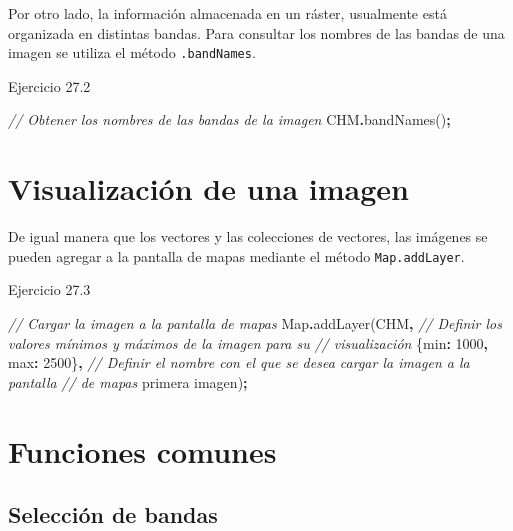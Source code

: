 \documentclass[
  12pt,
  letterpaper,
  twoside]{book}
\newenvironment{Shaded}{\begin{snugshade}}{\end{snugshade}}
\newcommand{\BuiltInTok}[1]{#1}
\newcommand{\CommentTok}[1]{\textcolor[rgb]{0.56,0.35,0.01}{\textit{#1}}}
\newcommand{\DataTypeTok}[1]{\textcolor[rgb]{0.13,0.29,0.53}{#1}}
\newcommand{\DecValTok}[1]{\textcolor[rgb]{0.00,0.00,0.81}{#1}}
\newcommand{\FunctionTok}[1]{\textcolor[rgb]{0.00,0.00,0.00}{#1}}
\newcommand{\NormalTok}[1]{#1}
\newcommand{\OperatorTok}[1]{\textcolor[rgb]{0.81,0.36,0.00}{\textbf{#1}}}
\newcommand{\StringTok}[1]{\textcolor[rgb]{0.31,0.60,0.02}{#1}}
\begin{document}
Por otro lado, la información almacenada en un ráster, usualmente está organizada en distintas bandas. Para consultar los nombres de las bandas de una imagen se utiliza el método \texttt{.bandNames}.

Ejercicio 27.2

\begin{Shaded}
\begin{Highlighting}[]
\CommentTok{// Obtener los nombres de las bandas de la imagen}
\NormalTok{CHM}\OperatorTok{.}\FunctionTok{bandNames}\NormalTok{()}\OperatorTok{;}
\end{Highlighting}
\end{Shaded}

\hypertarget{visualizaciuxf3n-de-una-imagen}{%
\section{Visualización de una imagen}\label{visualizaciuxf3n-de-una-imagen}}

De igual manera que los vectores y las colecciones de vectores, las imágenes se pueden agregar a la pantalla de mapas mediante el método \texttt{Map.addLayer}.

Ejercicio 27.3

\begin{Shaded}
\begin{Highlighting}[]
\CommentTok{// Cargar la imagen a la pantalla de mapas}
\BuiltInTok{Map}\OperatorTok{.}\FunctionTok{addLayer}\NormalTok{(CHM}\OperatorTok{,} 
  \CommentTok{// Definir los valores mínimos y máximos de la imagen para su }
  \CommentTok{// visualización}
\NormalTok{  \{}\DataTypeTok{min}\OperatorTok{:} \DecValTok{1000}\OperatorTok{,} \DataTypeTok{max}\OperatorTok{:} \DecValTok{2500}\NormalTok{\}}\OperatorTok{,} 
  \CommentTok{// Definir el nombre con el que se desea cargar la imagen a la pantalla }
  \CommentTok{// de mapas}
  \StringTok{\textquotesingle{}primera imagen\textquotesingle{}}\NormalTok{)}\OperatorTok{;}
\end{Highlighting}
\end{Shaded}

\hypertarget{funciones-comunes-3}{%
\section{Funciones comunes}\label{funciones-comunes-3}}

\hypertarget{selecciuxf3n-de-bandas}{%
\subsection{Selección de bandas}\label{selecciuxf3n-de-bandas}}
\end{document}
